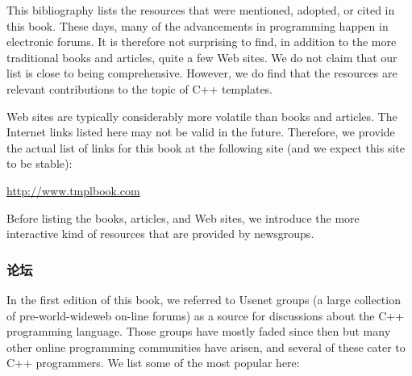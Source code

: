 
This bibliography lists the resources that were mentioned, adopted, or cited in this book. These days, many of the advancements in programming happen in electronic forums. It is therefore not surprising to find, in addition to the more traditional books and articles, quite a few Web sites. We do not claim that our list is close to being comprehensive. However, we do find that the resources are relevant contributions to the topic of C++ templates.

Web sites are typically considerably more volatile than books and articles. The Internet links listed here may not be valid in the future. Therefore, we provide the actual list of links for this book at the following site (and we expect this site to be stable):

\url{http://www.tmplbook.com}

Before listing the books, articles, and Web sites, we introduce the more interactive kind of resources that are provided by newsgroups.

\subsubsection*{论坛}

In the first edition of this book, we referred to Usenet groups (a large collection of pre-world-wideweb on-line forums) as a source for discussions about the C++ programming language. Those groups have mostly faded since then but many other online programming communities have arisen, and several of these cater to C++ programmers. We list some of the most popular here:

